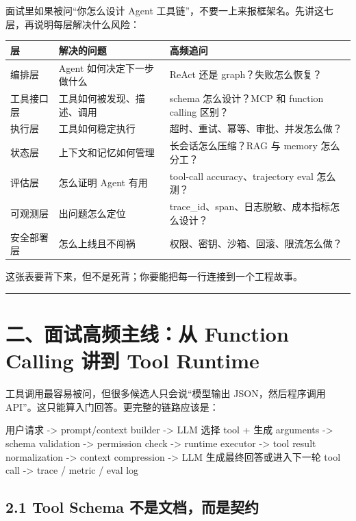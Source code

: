 面试里如果被问``你怎么设计 Agent 工具链''，不要一上来报框架名。先讲这七层，再说明每层解决什么风险：


\begingroup
\scriptsize
\setlength{\tabcolsep}{3pt}
\begin{longtable}{|p{}|p{}|p{}|}
\hline
层 & 解决的问题 & 高频追问 \\ \hline
编排层 & Agent 如何决定下一步做什么 & ReAct 还是 graph？失败怎么恢复？ \\ \hline
工具接口层 & 工具如何被发现、描述、调用 & schema 怎么设计？MCP 和 function calling 区别？ \\ \hline
执行层 & 工具如何稳定执行 & 超时、重试、幂等、审批、并发怎么做？ \\ \hline
状态层 & 上下文和记忆如何管理 & 长会话怎么压缩？RAG 与 memory 怎么分工？ \\ \hline
评估层 & 怎么证明 Agent 有用 & tool-call accuracy、trajectory eval 怎么测？ \\ \hline
可观测层 & 出问题怎么定位 & trace\_id、span、日志脱敏、成本指标怎么设计？ \\ \hline
安全部署层 & 怎么上线且不闯祸 & 权限、密钥、沙箱、回滚、限流怎么做？ \\ \hline
\end{longtable}
\endgroup

这张表要背下来，但不是死背；你要能把每一行连接到一个工程故事。


\bigskip\hrule\bigskip

\section{二、面试高频主线：从 Function Calling 讲到 Tool Runtime}

工具调用最容易被问，但很多候选人只会说``模型输出 JSON，然后程序调用 API''。这只能算入门回答。更完整的链路应该是：


\begin{codeblock}
用户请求
  -> prompt/context builder
  -> LLM 选择 tool + 生成 arguments
  -> schema validation
  -> permission check
  -> runtime executor
  -> tool result normalization
  -> context compression
  -> LLM 生成最终回答或进入下一轮 tool call
  -> trace / metric / eval log
\end{codeblock}

\subsection{2.1 Tool Schema 不是文档，而是契约}

